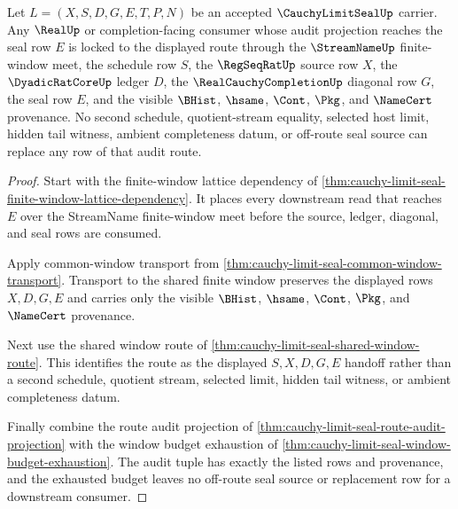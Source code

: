 \begin{theorem}
\label{thm:cauchy-limit-seal-window-budget-audit-lock}
Let $L=(X,S,D,G,E,T,P,N)$ be an accepted $\CauchyLimitSealUp$ carrier. Any $\RealUp$ or completion-facing consumer whose audit projection reaches the seal row $E$ is locked to the displayed route through the $\StreamNameUp$ finite-window meet, the schedule row $S$, the $\RegSeqRatUp$ source row $X$, the $\DyadicRatCoreUp$ ledger $D$, the $\RealCauchyCompletionUp$ diagonal row $G$, the seal row $E$, and the visible $\BHist$, $\hsame$, $\Cont$, $\Pkg$, and $\NameCert$ provenance. No second schedule, quotient-stream equality, selected host limit, hidden tail witness, ambient completeness datum, or off-route seal source can replace any row of that audit route.
\end{theorem}
\begin{proof}
Start with the finite-window lattice dependency of \autoref{thm:cauchy-limit-seal-finite-window-lattice-dependency}. It places every downstream read that reaches $E$ over the StreamName finite-window meet before the source, ledger, diagonal, and seal rows are consumed.

Apply common-window transport from \autoref{thm:cauchy-limit-seal-common-window-transport}. Transport to the shared finite window preserves the displayed rows $X,D,G,E$ and carries only the visible $\BHist$, $\hsame$, $\Cont$, $\Pkg$, and $\NameCert$ provenance.

Next use the shared window route of \autoref{thm:cauchy-limit-seal-shared-window-route}. This identifies the route as the displayed $S,X,D,G,E$ handoff rather than a second schedule, quotient stream, selected limit, hidden tail witness, or ambient completeness datum.

Finally combine the route audit projection of \autoref{thm:cauchy-limit-seal-route-audit-projection} with the window budget exhaustion of \autoref{thm:cauchy-limit-seal-window-budget-exhaustion}. The audit tuple has exactly the listed rows and provenance, and the exhausted budget leaves no off-route seal source or replacement row for a downstream consumer.
\end{proof}

